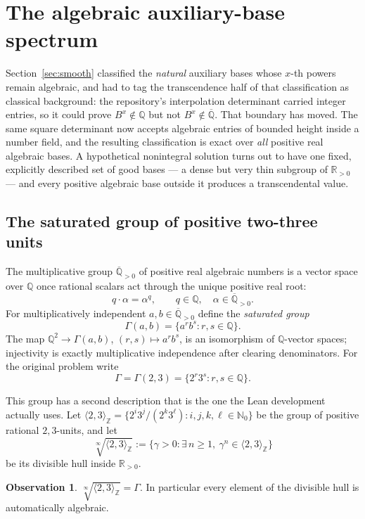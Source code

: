 \documentclass[11pt,oneside]{article}
\theoremstyle{definition}
\newtheorem{observation}[theorem]{Observation}
\theoremstyle{remark}
\newcommand{\Nzero}{\mathbb N_0}
\newcommand{\Z}{\mathbb Z}
\newcommand{\Q}{\mathbb Q}
\newcommand{\R}{\mathbb R}
\newcommand{\Abar}{\overline{\mathbb Q}}
\newcommand{\Apos}{\Abar_{>0}}
\newcommand{\GammaSat}{\Gamma}
\newcommand{\Qbar}{\Abar}
\begin{document}
\section{The algebraic auxiliary-base spectrum}\label{sec:spectrum}

Section~\ref{sec:smooth} classified the \emph{natural} auxiliary bases whose $x$-th powers
remain algebraic, and had to tag the transcendence half of that classification as classical
background: the repository's interpolation determinant carried integer entries, so it could
prove $B^x\notin\Q$ but not $B^x\notin\Qbar$.  That boundary has moved.  The same square
determinant now accepts algebraic entries of bounded height inside a number field, and the
resulting classification is exact over \emph{all} positive real algebraic bases.  A
hypothetical nonintegral solution turns out to have one fixed, explicitly described set of
good bases --- a dense but very thin subgroup of $\R_{>0}$ --- and every positive algebraic
base outside it produces a transcendental value.

\subsection{The saturated group of positive two-three units}

The multiplicative group $\Apos$ of positive real algebraic numbers is a vector space over
$\Q$ once rational scalars act through the unique positive real root:
\[
  q\cdot\alpha=\alpha^{q},
  \qquad q\in\Q,\quad \alpha\in\Apos.
\]
For multiplicatively independent $a,b\in\Apos$ define the \emph{saturated group}
\[
  \GammaSat(a,b)=\{a^{r}b^{s}:r,s\in\Q\}.
\]
The map $\Q^{2}\to\GammaSat(a,b)$, $(r,s)\mapsto a^{r}b^{s}$, is an isomorphism of
$\Q$-vector spaces; injectivity is exactly multiplicative independence after clearing
denominators.  For the original problem write
\[
  \GammaSat=\GammaSat(2,3)=\{2^{r}3^{s}:r,s\in\Q\}.
\]

This group has a second description that is the one the Lean development actually uses.  Let
$\langle2,3\rangle_{\Z}=\{2^{i}3^{j}/(2^{k}3^{\ell}):i,j,k,\ell\in\Nzero\}$ be the group of
positive rational $2,3$-units, and let
\[
  \sqrt[\infty]{\langle2,3\rangle_{\Z}}
  :=\{\gamma>0:\exists\,n\ge1,\ \gamma^{n}\in\langle2,3\rangle_{\Z}\}
\]
be its divisible hull inside $\R_{>0}$.

\begin{observation}\label{sp:hull-equals-gamma}
$\sqrt[\infty]{\langle2,3\rangle_{\Z}}=\GammaSat$.  In particular every element of the
divisible hull is automatically algebraic.
\end{observation}
\end{document}
